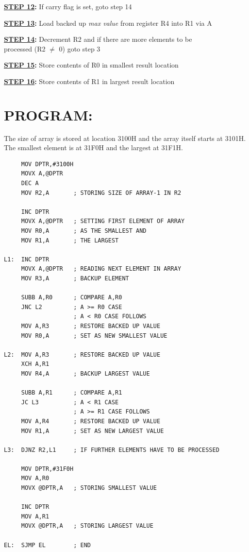 \documentclass[a4paper,28pt]{report}
\begin{document}
\textbf{\underline{STEP 12}:} If carry flag is set, goto step 14

\textbf{\underline{STEP 13}:} Load backed up \emph{max value} from register R4 into R1 via A

\textbf{\underline{STEP 14}:} Decrement R2 and if there are more elements to be \\\hspace*{62pt}processed (R2 $\neq$ 0) goto step 3

\textbf{\underline{STEP 15}:} Store contents of R0 in smallest result location

\textbf{\underline{STEP 16}:} Store contents of R1 in largest result location

\section*{PROGRAM:}
The size of array is stored at location 3100H and the array itself starts at 3101H. The smallest element is at 31F0H and the largest at 31F1H.

\begin{lstlisting}
     MOV DPTR,#3100H
     MOVX A,@DPTR
     DEC A
     MOV R2,A       ; STORING SIZE OF ARRAY-1 IN R2
     
     INC DPTR
     MOVX A,@DPTR   ; SETTING FIRST ELEMENT OF ARRAY
     MOV R0,A       ; AS THE SMALLEST AND
     MOV R1,A       ; THE LARGEST
     
L1:  INC DPTR
     MOVX A,@DPTR   ; READING NEXT ELEMENT IN ARRAY
     MOV R3,A       ; BACKUP ELEMENT
     
     SUBB A,R0      ; COMPARE A,R0
     JNC L2         ; A >= R0 CASE
                    ; A < R0 CASE FOLLOWS
     MOV A,R3       ; RESTORE BACKED UP VALUE
     MOV R0,A       ; SET AS NEW SMALLEST VALUE
     
L2:  MOV A,R3       ; RESTORE BACKED UP VALUE
     XCH A,R1
     MOV R4,A       ; BACKUP LARGEST VALUE
     
     SUBB A,R1      ; COMPARE A,R1
     JC L3          ; A < R1 CASE
                    ; A >= R1 CASE FOLLOWS
     MOV A,R4       ; RESTORE BACKED UP VALUE
     MOV R1,A       ; SET AS NEW LARGEST VALUE
     
L3:  DJNZ R2,L1     ; IF FURTHER ELEMENTS HAVE TO BE PROCESSED

     MOV DPTR,#31F0H
     MOV A,R0
     MOVX @DPTR,A   ; STORING SMALLEST VALUE
     
     INC DPTR
     MOV A,R1
     MOVX @DPTR,A   ; STORING LARGEST VALUE
     
EL:  SJMP EL        ; END
\end{lstlisting}
\end{document}
